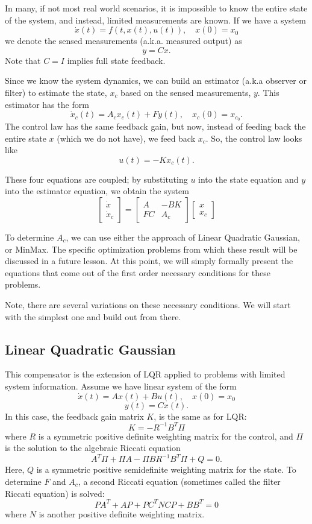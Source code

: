 In many, if not most real world scenarios, it is impossible to know the entire state of the system, and instead, limited measurements are known.  If we have a system
$$
\dot x(t) = f(t,x(t),u(t)), \quad x(0) = x_0
$$
we denote the sensed measurements (a.k.a. measured output) as
$$y = Cx.$$
Note that $C=I$ implies full state feedback.

Since we know the system dynamics, we can build an estimator (a.k.a observer or filter) to estimate the state, $x_c$ based on the sensed measurements, $y$. This estimator has the form
$$
\dot x_c(t) = A_cx_c(t) + Fy(t) , \quad x_c(0) = x_{c_0}.
$$
The control law has the same feedback gain, but now, instead of feeding back the entire state $x$ (which we do not have), we feed back $x_c$. So, the control law looks like
$$u(t) = -Kx_c(t).$$

These four equations are coupled; by substituting $u$ into the state equation and $y$ into the estimator equation, we obtain the system
$$\left[\begin{array}{c} \dot x\\ \dot x_c\end{array}\right] = \left[\begin{array}{cc}A & -BK \\ FC &A_c\end{array}\right]    \left[\begin{array}{c}  x\\  x_c\end{array}\right] $$

To determine $A_c$, we can use either the approach of Linear Quadratic Gaussian, or MinMax.  The specific optimization problems from which these result will be discussed in a future lesson. At this point, we will simply formally present the equations that come out of the first order necessary conditions for these problems.

Note,  there are several variations on these necessary conditions. We will start with the simplest one and build out from there.

\subsection{Linear Quadratic Gaussian}
This compensator is the extension of LQR applied to problems with limited system information. Assume we have linear system of the form
$$
\dot x(t) = Ax(t) + Bu(t), \quad x(0) = x_0
$$
$$ y(t) = Cx(t).$$
 In this case, the feedback gain matrix $K$, is the same as for LQR:
$$K = -R^{-1} B^T \Pi$$
where $R$ is a symmetric positive definite weighting matrix for the control, and $\Pi$ is the solution to the algebraic Riccati equation
$$A^T\Pi + \Pi A - \Pi BR^{-1}B^T \Pi + Q = 0.$$
Here, $Q$ is a symmetric positive semidefinite weighting matrix for the state.
To determine $F$ and $A_c$, a second Riccati equation (sometimes called the filter Riccati equation) is solved:
$$P A^T + AP + P C^TNC P + BB^T = 0$$
where $N$ is another positive definite weighting matrix.

